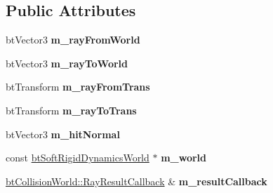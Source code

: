 \subsection*{Public Attributes}
\begin{DoxyCompactItemize}
\item 
\hypertarget{structbt_soft_single_ray_callback_a68f6d8119b8d1895ae9765c3e585ed2f}{bt\+Vector3 {\bfseries m\+\_\+ray\+From\+World}}\label{structbt_soft_single_ray_callback_a68f6d8119b8d1895ae9765c3e585ed2f}

\item 
\hypertarget{structbt_soft_single_ray_callback_a0e42ccec50994139110bd733ed11b347}{bt\+Vector3 {\bfseries m\+\_\+ray\+To\+World}}\label{structbt_soft_single_ray_callback_a0e42ccec50994139110bd733ed11b347}

\item 
\hypertarget{structbt_soft_single_ray_callback_a132922b82b3241e0519c8adc01cc4ce3}{bt\+Transform {\bfseries m\+\_\+ray\+From\+Trans}}\label{structbt_soft_single_ray_callback_a132922b82b3241e0519c8adc01cc4ce3}

\item 
\hypertarget{structbt_soft_single_ray_callback_a851cf14d6a16dd7e0616498c20cbb2ab}{bt\+Transform {\bfseries m\+\_\+ray\+To\+Trans}}\label{structbt_soft_single_ray_callback_a851cf14d6a16dd7e0616498c20cbb2ab}

\item 
\hypertarget{structbt_soft_single_ray_callback_a3c7f2ca88411446fe10a57fe767232b0}{bt\+Vector3 {\bfseries m\+\_\+hit\+Normal}}\label{structbt_soft_single_ray_callback_a3c7f2ca88411446fe10a57fe767232b0}

\item 
\hypertarget{structbt_soft_single_ray_callback_a7d1f57ecc6246ada02f47c144069878a}{const \hyperlink{classbt_soft_rigid_dynamics_world}{bt\+Soft\+Rigid\+Dynamics\+World} $\ast$ {\bfseries m\+\_\+world}}\label{structbt_soft_single_ray_callback_a7d1f57ecc6246ada02f47c144069878a}

\item 
\hypertarget{structbt_soft_single_ray_callback_ad8b8d0e1e2031ee44c6ab40ef646a680}{\hyperlink{structbt_collision_world_1_1_ray_result_callback}{bt\+Collision\+World\+::\+Ray\+Result\+Callback} \& {\bfseries m\+\_\+result\+Callback}}\label{structbt_soft_single_ray_callback_ad8b8d0e1e2031ee44c6ab40ef646a680}

\end{DoxyCompactItemize}


